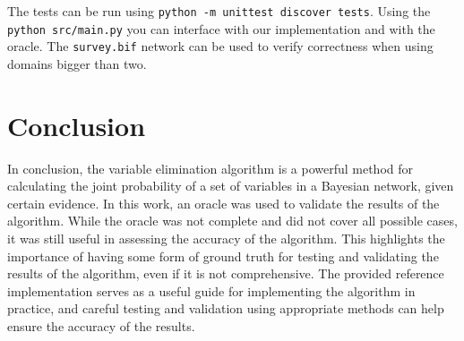 \documentclass[a4paper]{article}
\begin{document}
The tests can be run using \texttt{python -m unittest discover tests}. Using
the \texttt{python src/main.py} you can interface with our implementation and
with the oracle. The \texttt{survey.bif} network can be used to verify
correctness when using domains bigger than two.

\section{Conclusion}\label{sec: conclusion}
In conclusion, the variable elimination algorithm is a powerful method for
calculating the joint probability of a set of variables in a Bayesian network,
given certain evidence. In this work, an oracle was used to validate the
results of the algorithm. While the oracle was not complete and did not cover
all possible cases, it was still useful in assessing the accuracy of the
algorithm. This highlights the importance of having some form of ground truth
for testing and validating the results of the algorithm, even if it is not
comprehensive. The provided reference implementation serves as a useful guide
for implementing the algorithm in practice, and careful testing and validation
using appropriate methods can help ensure the accuracy of the results.
\end{document}
